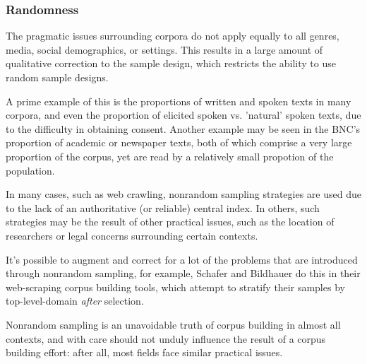 


\subsubsection{Randomness}
The pragmatic issues surrounding corpora do not apply equally to all genres, media, social demographics, or settings.  This results in a large amount of qualitative correction to the sample design, which restricts the ability to use random sample designs.

A prime example of this is the proportions of written and spoken texts in many corpora, and even the proportion of elicited spoken vs. 'natural' spoken texts, due to the difficulty in obtaining consent.  Another example may be seen in the BNC's proportion of academic or newspaper texts, both of which comprise a very large proportion of the corpus, yet are read by a relatively small propotion of the population.

In many cases, such as web crawling, nonrandom sampling strategies are used due to the lack of an authoritative (or reliable) central index.  In others, such strategies may be the result of other practical issues, such as the location of researchers or legal concerns surrounding certain contexts.

It's possible to augment and correct for a lot of the problems that are introduced through nonrandom sampling, for example, Schafer and Bildhauer do this in their web-scraping corpus building tools, which attempt to stratify their samples by top-level-domain \textsl{after} selection\cite{schafer2014focused}.

Nonrandom sampling is an unavoidable truth of corpus building in almost all contexts, and with care should not unduly influence the result of a corpus building effort: after all, most fields face similar practical issues.


